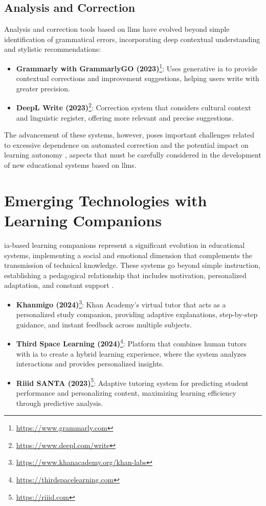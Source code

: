 \subsection{Analysis and Correction}
\label{subsec:analysis-correction}

Analysis and correction tools based on \gls{llm}s have evolved beyond simple identification of grammatical errors, incorporating deep contextual understanding and stylistic recommendations:


\begin{itemize}
  \item \textbf{Grammarly with GrammarlyGO (2023)}\footnote{\url{https://www.grammarly.com}}: Uses generative \gls{ia} to provide contextual corrections and improvement suggestions, helping users write with greater precision.
  \item \textbf{DeepL Write (2023)}\footnote{\url{https://www.deepl.com/write}}: Correction system that considers cultural context and linguistic register, offering more relevant and precise suggestions.
\end{itemize}

The advancement of these systems, however, poses important challenges related to excessive dependence on automated correction and the potential impact on learning autonomy \cite{Rodriguez2023}, aspects that must be carefully considered in the development of new educational systems based on \gls{llm}s.


\section{Emerging Technologies with Learning Companions}
\label{sec:learning-companions}

\gls{ia}-based learning companions represent a significant evolution in educational systems, implementing a social and emotional dimension that complements the transmission of technical knowledge. These systems go beyond simple instruction, establishing a pedagogical relationship that includes motivation, personalized adaptation, and constant support \citep{baker2014educational}.

\begin{itemize}
  \item \textbf{Khanmigo (2024)}\footnote{\url{https://www.khanacademy.org/khan-labs}}: Khan Academy's virtual tutor that acts as a personalized study companion, providing adaptive explanations, step-by-step guidance, and instant feedback across multiple subjects.

  \item \textbf{Third Space Learning (2024)}\footnote{\url{https://thirdspacelearning.com}}: Platform that combines human tutors with \gls{ia} to create a hybrid learning experience, where the system analyzes interactions and provides personalized insights.

  \item \textbf{Riiid SANTA (2023)}\footnote{\url{https://riiid.com}}: Adaptive tutoring system for predicting student performance and personalizing content, maximizing learning efficiency through predictive analysis.
\end{itemize}

